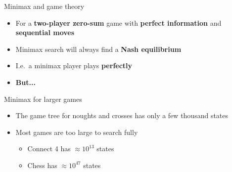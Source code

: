 \begin{frame}{Minimax and game theory}
	\begin{itemize}
		\pause\item For a \textbf{two-player zero-sum} game
			with \textbf{perfect information} and \textbf{sequential moves}
		\pause\item Minimax search will always find a \textbf{Nash equilibrium}
		\pause\item I.e.\ a minimax player plays \textbf{perfectly}
		\pause\item \textbf{But...}
	\end{itemize}
\end{frame}

\begin{frame}{Minimax for larger games}
	\begin{itemize}
		\pause\item The game tree for noughts and crosses has only a few thousand states
		\pause\item Most games are too large to search fully
			\begin{itemize}
				\pause\item Connect 4 has $\approx 10^{13}$ states
				\pause\item Chess has $\approx 10^{47}$ states
			\end{itemize}
	\end{itemize}
\end{frame}

